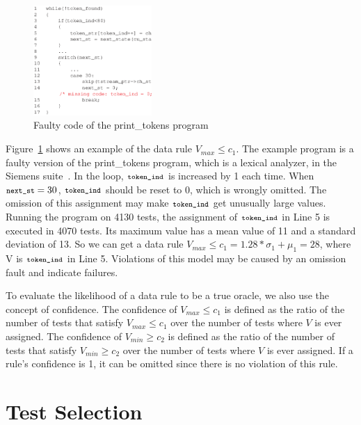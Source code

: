 \documentclass{sig-alternate}
\newcommand{\CodeIn}[1]{{\small\texttt{#1}}}
\begin{document}
\begin{figure}[h]
  \includegraphics[angle=0,width=0.4\textwidth]{figs/example31.eps}
  \centering
  \caption{Faulty code of the print\_tokens program}
  \label{fig:example3} \vspace{-0.2in}
\end{figure}

Figure~\ref{fig:example3} shows an example of the data rule
$V_{max}\le c_1$. The example program is a faulty version of the
print\_tokens program, which is a lexical analyzer, in the Siemens
suite~\cite{Hutchins94}. In the loop, $\CodeIn{token\_ind}$ is
increased by 1 each time. When $\CodeIn{next\_st}=30$,
$\CodeIn{token\_ind}$ should be reset to 0, which is wrongly
omitted. The omission of this assignment may make
$\CodeIn{token\_ind}$ get unusually large values. Running the
program on 4130 tests, the assignment of $\CodeIn{token\_ind}$ in
Line 5 is executed in 4070 tests. Its maximum value has a mean value
of 11 and a standard deviation of 13. So we can get a data rule
$V_{max}\le c_1=1.28*\sigma_1+\mu_1=28$, where V is
$\CodeIn{token\_ind}$ in Line 5. Violations of this model may be
caused by an omission fault and indicate failures.



To evaluate the likelihood of a data rule to be a true oracle, we
also use the concept of confidence. The confidence of $V_{max}\le
c_1$ is defined as the ratio of the number of tests that satisfy
$V_{max}\le c_1$ over the number of tests where $V$ is ever
assigned. The confidence of $V_{min}\ge c_2$ is defined as the ratio
of the number of tests that satisfy $V_{min}\ge c_2$ over the number
of tests where $V$ is ever assigned. If a rule's confidence is 1, it
can be omitted since there is no violation of this rule.




\section{Test Selection} \label{sec:select}
\end{document}
